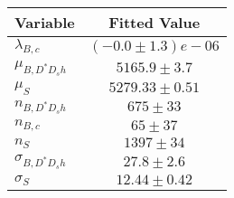 \begin{tabular}[t]{lc}
\hline
Variable &Fitted Value\\
\hline\hline
$\lambda_{B,c}$&$(-0.0\pm1.3)e-06$\\
\hline
$\mu_{B, D^* D_s h}$&$5165.9\pm3.7$\\
\hline
$\mu_S$&$5279.33\pm0.51$\\
\hline
$n_{B, D^* D_s h}$&$675\pm33$\\
\hline
$n_{B,c}$&$65\pm37$\\
\hline
$n_S$&$1397\pm34$\\
\hline
$\sigma_{B, D^* D_s h}$&$27.8\pm2.6$\\
\hline
$\sigma_S$&$12.44\pm0.42$\\
\hline
\end{tabular}